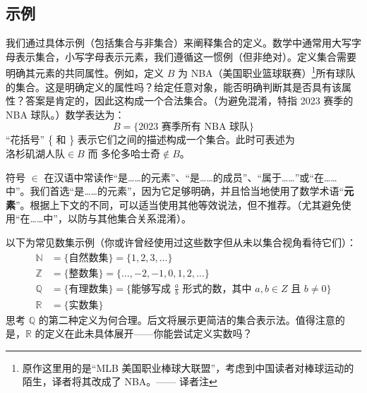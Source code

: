 \subsection{示例}

我们通过具体示例（包括集合与非集合）来阐释集合的定义。数学中通常用大写字母表示集合，小写字母表示元素，我们遵循这一惯例（但非绝对）。定义集合需要明确其元素的共同属性。例如，定义 $B$ 为 NBA（美国职业篮球联赛）\footnote{原作这里用的是``MLB 美国职业棒球大联盟''，考虑到中国读者对棒球运动的陌生，译者将其改成了 NBA。—— 译者注}所有球队的集合。这是明确定义的属性吗？给定任意对象，能否明确判断其是否具有该属性？答案是肯定的，因此这构成一个合法集合。（为避免混淆，特指 2023 赛季的 NBA 球队。）数学表达为：
\[B = \{\text{2023\ 赛季所有\ NBA\ 球队}\}\]
``花括号'' \{ 和 \} 表示它们之间的描述构成一个集合。此时可表述为 $\text{洛杉矶湖人队} \in B$ 而 $\text{多伦多哈士奇} \notin B$。

符号 $\in$ 在汉语中常读作``是……的元素''、``是……的成员''、``属于……''或``在……中''。我们首选``是……的元素''，因为它足够明确，并且恰当地使用了数学术语``\textbf{元素}''。根据上下文的不同，可以适当使用其他等效说法，但不推荐。（尤其避免使用``在……中''，以防与其他集合关系混淆）。

以下为常见数集示例（你或许曾经使用过这些数字但从未以集合视角看待它们）：
\begin{align*}
    \mathbb{N} &= \{ \text{自然数集} \} = \{1, 2, 3, \dots\}\\
    \mathbb{Z} &= \{ \text{整数集} \} = \{\dots , -2, -1, 0, 1, 2, \dots\}\\
    \mathbb{Q} &= \{ \text{有理数集} \} = \{ \text{能够写成\ } \frac{a}{b} \text{\ 形式的数，其中\ } a, b \in Z \text{\ 且\ } b \ne 0 \}\\
    \mathbb{R} &= \{ \text{实数集}\}
\end{align*}
思考 $\mathbb{Q}$ 的第二种定义为何合理。后文将展示更简洁的集合表示法。值得注意的是，$\mathbb{R}$ 的定义在此未具体展开——你能尝试定义实数吗？
